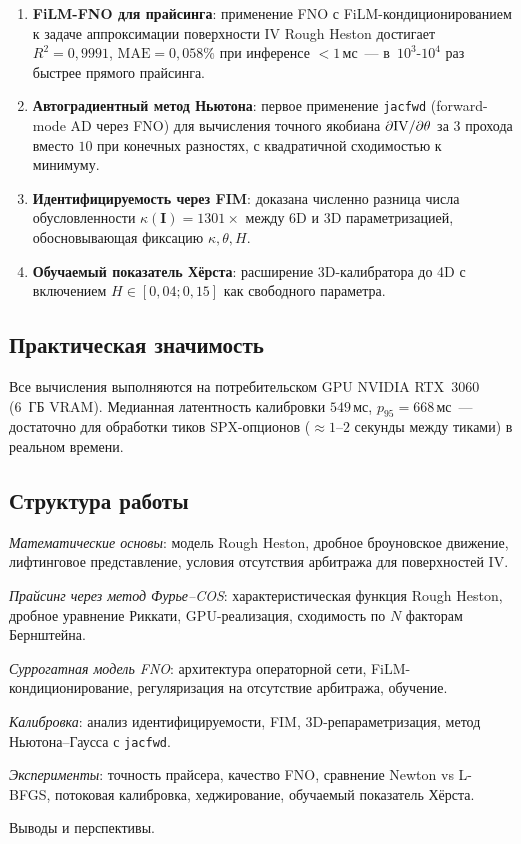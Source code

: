\begin{enumerate}
  \item \textbf{FiLM-FNO для прайсинга}: применение FNO с FiLM-кондиционированием
        к задаче аппроксимации поверхности IV Rough Heston достигает
        $R^2 = 0{,}9991$, $\text{MAE} = 0{,}058\%$ при инференсе $< 1\,\text{мс}$~---
        в~$10^3$-$10^4$ раз быстрее прямого прайсинга.
  \item \textbf{Автоградиентный метод Ньютона}: первое применение \texttt{jacfwd}
        (forward-mode AD через FNO) для вычисления точного якобиана
        $\partial \mathrm{IV} / \partial \theta$ за $3$ прохода вместо $10$ при конечных
        разностях, с квадратичной сходимостью к минимуму.
  \item \textbf{Идентифицируемость через FIM}: доказана численно разница числа
        обусловленности $\kappa(\mathbf{I}) = 1301\times$ между 6D и 3D
        параметризацией, обосновывающая фиксацию $\kappa, \theta, H$.
  \item \textbf{Обучаемый показатель Хёрста}: расширение 3D-калибратора до 4D
        с включением $H \in [0{,}04; 0{,}15]$ как свободного параметра.
\end{enumerate}

\subsection*{Практическая значимость}

Все вычисления выполняются на потребительском GPU NVIDIA RTX~3060 (6~ГБ VRAM).
Медианная латентность калибровки $549\,\text{мс}$, $p_{95} = 668\,\text{мс}$~---
достаточно для обработки тиков SPX-опционов ($\approx 1$--$2$ секунды между
тиками) в реальном времени.

\subsection*{Структура работы}

\begin{description}[leftmargin=2cm, style=nextline]
  \item[Глава~1.] \textit{Математические основы}: модель Rough Heston,
        дробное броуновское движение, лифтинговое представление, условия
        отсутствия арбитража для поверхностей IV.
  \item[Глава~2.] \textit{Прайсинг через метод Фурье--COS}: характеристическая
        функция Rough Heston, дробное уравнение Риккати, GPU-реализация,
        сходимость по $N$ факторам Бернштейна.
  \item[Глава~3.] \textit{Суррогатная модель FNO}: архитектура операторной сети,
        FiLM-кондиционирование, регуляризация на отсутствие арбитража, обучение.
  \item[Глава~4.] \textit{Калибровка}: анализ идентифицируемости, FIM,
        3D-репараметризация, метод Ньютона--Гаусса с \texttt{jacfwd}.
  \item[Глава~5.] \textit{Эксперименты}: точность прайсера, качество FNO,
        сравнение Newton vs L-BFGS, потоковая калибровка, хеджирование,
        обучаемый показатель Хёрста.
  \item[Заключение.] Выводы и перспективы.
\end{description}
